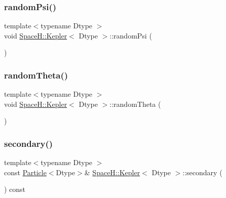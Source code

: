 \subsubsection{\texorpdfstring{random\+Psi()}{randomPsi()}}
{\footnotesize\ttfamily template$<$typename Dtype $>$ \\
void \mbox{\hyperlink{struct_space_h_1_1_kepler}{Space\+H\+::\+Kepler}}$<$ Dtype $>$\+::random\+Psi (\begin{DoxyParamCaption}{ }\end{DoxyParamCaption})\hspace{0.3cm}{\ttfamily [inline]}}

\mbox{\label{struct_space_h_1_1_kepler_a8d8e745f0a2773e1e3469f25ca6cac76}} 
\subsubsection{\texorpdfstring{random\+Theta()}{randomTheta()}}
{\footnotesize\ttfamily template$<$typename Dtype $>$ \\
void \mbox{\hyperlink{struct_space_h_1_1_kepler}{Space\+H\+::\+Kepler}}$<$ Dtype $>$\+::random\+Theta (\begin{DoxyParamCaption}{ }\end{DoxyParamCaption})\hspace{0.3cm}{\ttfamily [inline]}}

\mbox{\label{struct_space_h_1_1_kepler_a40fb68cda1662a2ae76e541e2c8fadb8}} 
\subsubsection{\texorpdfstring{secondary()}{secondary()}}
{\footnotesize\ttfamily template$<$typename Dtype $>$ \\
const \mbox{\hyperlink{struct_space_h_1_1_particle}{Particle}}$<$Dtype$>$\& \mbox{\hyperlink{struct_space_h_1_1_kepler}{Space\+H\+::\+Kepler}}$<$ Dtype $>$\+::secondary (\begin{DoxyParamCaption}{ }\end{DoxyParamCaption}) const\hspace{0.3cm}{\ttfamily [inline]}}

